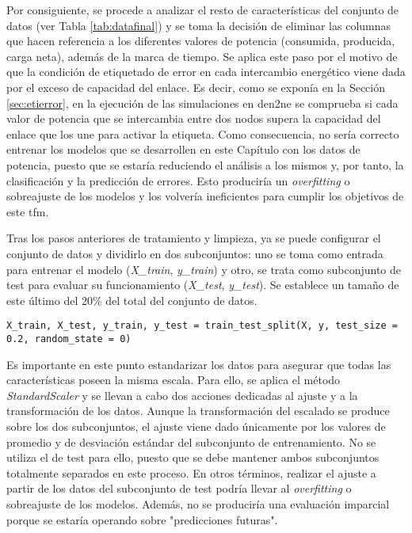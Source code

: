Por consiguiente, se procede a analizar el resto de características del conjunto de datos (ver Tabla \ref{tab:datafinal}) y se toma la decisión de eliminar las columnas que hacen referencia a los diferentes valores de potencia (consumida, producida, carga neta), además de la marca de tiempo. Se aplica este paso por el motivo de que la condición de etiquetado de error en cada intercambio energético viene dada por el exceso de capacidad del enlace. Es decir, como se exponía en la Sección \ref{sec:etierror}, en la ejecución de las simulaciones en \gls{den2ne} se comprueba si cada valor de potencia que se intercambia entre dos nodos supera la capacidad del enlace que los une para activar la etiqueta. Como consecuencia, no sería correcto entrenar los modelos que se desarrollen en este Capítulo con los datos de potencia, puesto que se estaría reduciendo el análisis a los mismos y, por tanto, la clasificación y la predicción de errores. Esto produciría un \textit{overfitting} o sobreajuste de los modelos y los volvería ineficientes para cumplir los objetivos de este \gls{tfm}.

\vspace{3mm}

Tras los pasos anteriores de tratamiento y limpieza, ya se puede configurar el conjunto de datos y dividirlo en dos subconjuntos: uno se toma como entrada para entrenar el modelo (\textit{X\_train}, \textit{y\_train}) y otro, se trata como subconjunto de test para evaluar su funcionamiento (\textit{X\_test}, \textit{y\_test}). Se establece un tamaño de este último del 20\% del total del conjunto de datos.

\vspace{3mm}

\begin{lstlisting}[style=Python, caption={Codificación de los datos categóricos}]
  X_train, X_test, y_train, y_test = train_test_split(X, y, test_size = 0.2, random_state = 0)
\end{lstlisting}

\vspace{3mm}

Es importante en este punto estandarizar los datos para asegurar que todas las características poseen la misma escala. Para ello, se aplica el método \textit{StandardScaler} y se llevan a cabo dos acciones dedicadas al ajuste y a la transformación de los datos. Aunque la transformación del escalado se produce sobre los dos subconjuntos, el ajuste viene dado únicamente por los valores de promedio y de desviación estándar del subconjunto de entrenamiento. No se utiliza el de test para ello, puesto que se debe mantener ambos subconjuntos totalmente separados en este proceso. En otros términos, realizar el ajuste a partir de los datos del subconjunto de test podría llevar al \textit{overfitting} o sobreajuste de los modelos. Además, no se produciría una evaluación imparcial porque se estaría operando sobre "predicciones futuras".

